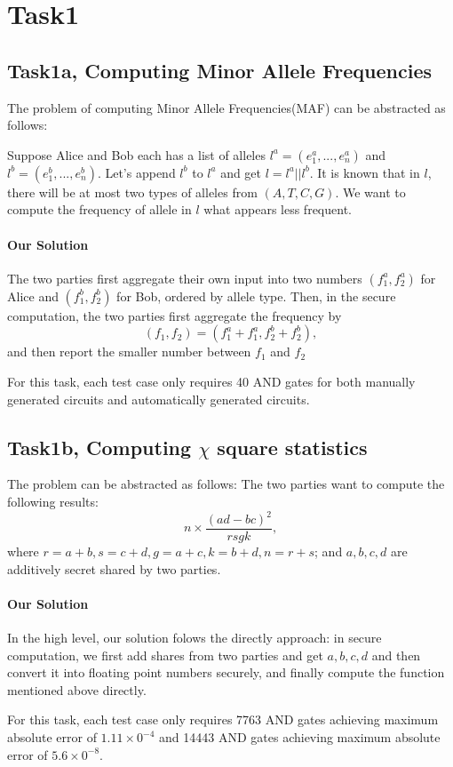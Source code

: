 \section{Task1}
\subsection{Task1a, Computing Minor Allele Frequencies}
The problem of computing Minor Allele Frequencies(MAF) can be abstracted as follows:

Suppose Alice and Bob each has a list of alleles $l^a = (e^a_1,...,e^a_n)$ and $l^b = (e^b_1,...,e^b_n)$.
Let's append $l^b$ to $l^a$ and get $l = l^a || l^b$. It is known that in $l$, there will be at most two types of
alleles from $(A,T,C,G)$. We want to compute the frequency of allele in $l$ what appears less frequent.

\paragraph{Our Solution}
The two parties first aggregate their own input into two numbers $(f^a_1, f^a_2)$ for Alice and $(f^b_1,f^b_2)$ for Bob, ordered by allele type.
Then, in the secure computation, the two parties first aggregate the frequency by
$$(f_1, f_2) = (f^a_1+f^a_1, f^b_2+f^b_2),$$
and then report the smaller number between $f_1$ and $f_2$

For this task, each test case only requires 40 AND gates for both manually generated circuits and automatically generated circuits.

\subsection{Task1b, Computing $\chi$ square statistics}
The problem can be abstracted as follows:
The two parties want to compute the following results:
$$n\times\frac{(ad-bc)^2}{rsgk},$$
where $r = a + b, s = c + d, g = a + c, k = b + d, n =  r + s$; and $a,b,c,d$ are additively secret shared by two parties.

\paragraph{Our Solution}
In the high level, our solution folows the directly approach: in secure computation, we first add shares from two parties and get $a,b,c,d$
and then convert it into floating point numbers securely, and finally compute the function mentioned above directly.

For this task, each test case only requires 7763 AND gates achieving maximum absolute error of $1.11\times0^{-4}$
and 14443 AND gates achieving maximum absolute error of $5.6\times0^{-8}$.
